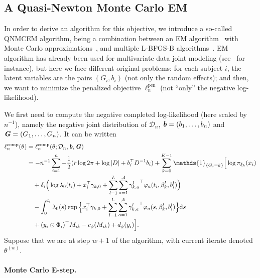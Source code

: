 \documentclass[11pt]{article}
\newcommand{\dd}{\mathrm{d}}
\newcommand{\ind}[1]{\mathds{1}_{#1}}
\newcommand{\cD}{\mathcal D}
\newcommand{\cA}{\mathcal A}
\begin{document}
\subsection{A Quasi-Newton Monte Carlo EM}
\label{sec:QNMCEM}

In order to derive an algorithm for this objective, we introduce a so-called QNMCEM algorithm, being a combination
between an EM algorithm~\citep{dempster1977maximum} with Monte Carlo approximations~\citep{levine2001implementations}, and multiple L-BFGS-B algorithms~\citep{zhu1997algorithm}. EM algorithm has already been used for multivariate data joint modeling (see~\citet{lin2002maximum} for instance), but here we face different original problems: for each subject $i$, the latent variables are the pairs $(G_i, b_i)$ (not only the random effects); and then, we want to minimize the penalized objective $\ell_n^\text{pen}$ (not ``only'' the negative log-likelihood).

We first need to compute the negative completed log-likelihood (here scaled by $n^{-1}$), namely the negative joint distribution of $\cD_n$, $\textbf{\textit{b}} = (b_1, \ldots, b_n)$ and $\textbf{\textit{G}} = (G_1, \ldots, G_n)$.
It can be written
\begin{align*}
  \ell_n^\text{comp}(\theta) &= \ell_n^\text{comp}(\theta ; \cD_n, \textbf{\textit{b}}, \textbf{\textit{G}}) \\ 
  &= - n^{-1} \sum_{i=1}^n -\dfrac12 (r \log 2\pi + \log|D| + b_i^\top D^{-1}b_i) + \sum_{k=0}^{K-1} \ind{\{G_i=k\}} \Big[ \log \pi_{\xi_k}(x_i) \\ 
  & \quad + \delta_i \Big(\log \lambda_0(t_i) + x_i^\top \gamma_{k,0} + \sum_{l=1}^L \sum_{a=1}^\cA {\gamma_{k,a}^l}^\top \varphi_a(t_i, \beta_k^l, b_i^l) \Big) \\
  & \quad -\int_0^{t_i} \lambda_0(s) \exp \Big\{ x_i^\top \gamma_{k,0} + \sum_{l=1}^L \sum_{a=1}^\cA {\gamma_{k,a}^l}^\top \varphi_a(s, \beta_k^l, b_i^l) \Big\} \dd s \\
  & \quad + (y_i \odot \Phi_i)^\top M_{ik} - c_\phi(M_{ik}) + d_\phi(y_i) \Big].
\end{align*}
Suppose that we are at step $w + 1$ of the algorithm, with current iterate denoted $\theta^{(w)}$. 

\paragraph*{Monte Carlo E-step.}
\end{document}
